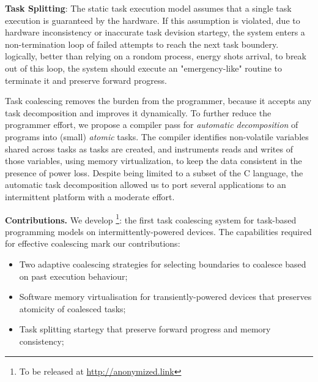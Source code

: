 \textbf{Task Splitting}: The static task execution model assumes that a single task execution is guaranteed by the hardware. If this assumption is violated, due to hardware inconsistency or inaccurate task devision startegy, the system enters a non-termination loop of failed attempts to reach the next task boundery. logically, better than relying on a rondom process, energy shots arrival, to break out of this loop, the system should execute an "emergency-like" routine to terminate it and preserve forward progress.

Task coalescing removes the burden from the programmer, because it accepts any task decomposition and improves it dynamically. To further reduce the programmer effort, we propose a compiler pass for \emph{automatic decomposition} of programs into (small) \emph{atomic} tasks. The compiler identifies non-volatile variables shared across tasks as tasks are created, and instruments reads and writes of those variables, using memory virtualization, to keep the data consistent in the presence of power loss. Despite being limited to a subset of the C language, the automatic task decomposition allowed us to port several
applications to an intermittent platform with a moderate effort.

\textbf{Contributions.} We develop \sys\footnote{To be released at \url{http://anonymized.link}}: the first task coalescing system for task-based programming models on intermittently-powered devices. The capabilities required for effective coalescing mark our contributions:

\begin{itemize}
	\item Two adaptive coalescing strategies for selecting boundaries to coalesce based on past execution behaviour;
	\item Software memory virtualisation for transiently-powered devices that preserves atomicity of coalesced tasks;
	\item Task splitting startegy that preserve forward progress and memory consistency;
\end{itemize}


